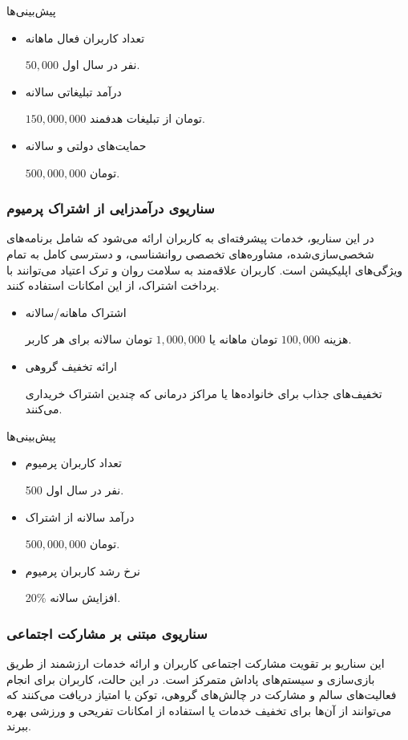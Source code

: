 \documentclass[dvipsnames, svgnames, x11names, 11pt]{article}
\begin{document}
پیش‌بینی‌ها
\begin{itemize}
\item 
تعداد کاربران فعال ماهانه

$50,000$
نفر در سال اول.
\item 
درآمد تبلیغاتی سالانه

$150,000,000$
تومان از تبلیغات هدفمند.
\item 
حمایت‌های دولتی و  سالانه

$500,000,000$
تومان.
\end{itemize}


\subsubsection{سناریوی درآمدزایی از اشتراک پرمیوم }
در این سناریو، خدمات پیشرفته‌ای به کاربران ارائه می‌شود که شامل برنامه‌های شخصی‌سازی‌شده، مشاوره‌های تخصصی روانشناسی، و دسترسی کامل به تمام ویژگی‌های اپلیکیشن است. کاربران علاقه‌مند به سلامت روان و ترک اعتیاد می‌توانند با پرداخت اشتراک، از این امکانات استفاده کنند.
\begin{itemize}
\item
اشتراک ماهانه/سالانه

هزینه
$100,000$
تومان ماهانه یا
$1,000,000$
تومان سالانه برای هر کاربر.

\item
ارائه تخفیف گروهی

تخفیف‌های جذاب برای خانواده‌ها یا مراکز درمانی که چندین اشتراک خریداری می‌کنند.
\end{itemize}
پیش‌بینی‌ها

\begin{itemize}
\item 
تعداد کاربران پرمیوم

500 نفر در سال اول.
\item 
درآمد سالانه از اشتراک

$500,000,000$
تومان.
\item 
نرخ رشد کاربران پرمیوم

20\% افزایش سالانه.
\end{itemize}

\subsubsection{سناریوی مبتنی بر مشارکت اجتماعی }
این سناریو بر تقویت مشارکت اجتماعی کاربران و ارائه خدمات ارزشمند از طریق بازی‌سازی  و سیستم‌های پاداش متمرکز است. در این حالت، کاربران برای انجام فعالیت‌های سالم و مشارکت در چالش‌های گروهی، توکن یا امتیاز دریافت می‌کنند که می‌توانند از آن‌ها برای تخفیف خدمات یا استفاده از امکانات تفریحی و ورزشی بهره ببرند.
\end{document}
